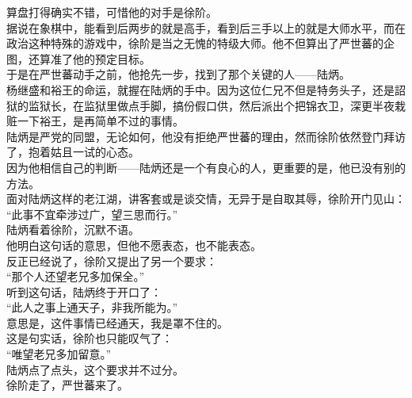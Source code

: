 \begin{multicols}{\theparacolNo}
算盘打得确实不错，可惜他的对手是徐阶。\\

据说在象棋中，能看到后两步的就是高手，看到后三手以上的就是大师水平，而在政治这种特殊的游戏中，徐阶是当之无愧的特级大师。他不但算出了严世蕃的企图，还算准了他的预定目标。\\

于是在严世蕃动手之前，他抢先一步，找到了那个关键的人——陆炳。\\

杨继盛和裕王的命运，就握在陆炳的手中。因为这位仁兄不但是特务头子，还是詔狱的监狱长，在监狱里做点手脚，搞份假口供，然后派出个把锦衣卫，深更半夜栽赃一下裕王，是再简单不过的事情。\\

陆炳是严党的同盟，无论如何，他没有拒绝严世蕃的理由，然而徐阶依然登门拜访了，抱着姑且一试的心态。\\

因为他相信自己的判断——陆炳还是一个有良心的人，更重要的是，他已没有别的方法。\\

面对陆炳这样的老江湖，讲客套或是谈交情，无异于是自取其辱，徐阶开门见山：\\

“此事不宜牵涉过广，望三思而行。”\\

陆炳看着徐阶，沉默不语。\\

他明白这句话的意思，但他不愿表态，也不能表态。\\

反正已经说了，徐阶又提出了另一个要求：\\

“那个人还望老兄多加保全。”\\

听到这句话，陆炳终于开口了：\\

“此人之事上通天子，非我所能为。”\\

意思是，这件事情已经通天，我是罩不住的。\\

这是句实话，徐阶也只能叹气了：\\

“唯望老兄多加留意。”\\

陆炳点了点头，这个要求并不过分。\\

徐阶走了，严世蕃来了。\\


\end{multicols}
